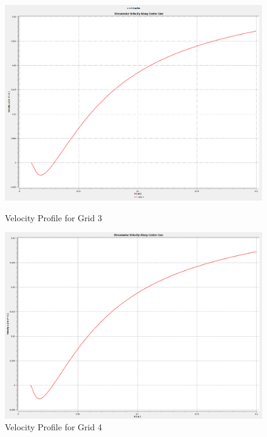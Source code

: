 \begin{figure}[H]
    \centering
    \begin{minipage}{0.45\textwidth}
        \centering
        \includegraphics[width=\textwidth]{Questions/Figures/u velocity along centerline grid 3.png}
        \caption{Velocity Profile for Grid 3}
        \label{fig:velocity_profile_grid_3}
    \end{minipage}
    \begin{minipage}{0.45\textwidth}
        \centering
        \includegraphics[width=\textwidth]{Questions/Figures/u velocity along centerline grid 4.png}
        \caption{Velocity Profile for Grid 4}
        \label{fig:velocity_profile_grid_4}
    \end{minipage}
\end{figure}

